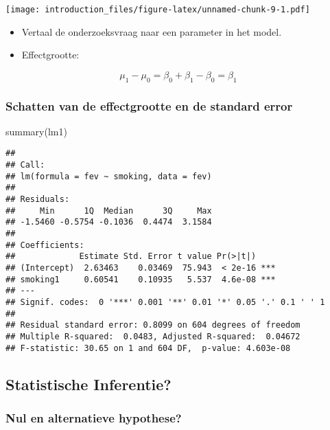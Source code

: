 \documentclass[
]{article}
\newenvironment{Shaded}{\begin{snugshade}}{\end{snugshade}}
\newcommand{\FunctionTok}[1]{\textcolor[rgb]{0.00,0.00,0.00}{#1}}
\newcommand{\NormalTok}[1]{#1}
\begin{document}
\texttt{[image: introduction\_files/figure-latex/unnamed-chunk-9-1.pdf]}

\begin{itemize}
\item
  Vertaal de onderzoeksvraag naar een parameter in het model.
\item
  Effectgrootte:
\end{itemize}

\[\mu_1-\mu_0 = \beta_0+\beta_1 - \beta_0 = \beta_1\]

\hypertarget{schatten-van-de-effectgrootte-en-de-standard-error}{%
\subsubsection{Schatten van de effectgrootte en de standard
error}\label{schatten-van-de-effectgrootte-en-de-standard-error}}

\begin{Shaded}
\begin{Highlighting}[]
\FunctionTok{summary}\NormalTok{(lm1)}
\end{Highlighting}
\end{Shaded}

\begin{verbatim}
## 
## Call:
## lm(formula = fev ~ smoking, data = fev)
## 
## Residuals:
##     Min      1Q  Median      3Q     Max 
## -1.5460 -0.5754 -0.1036  0.4474  3.1584 
## 
## Coefficients:
##             Estimate Std. Error t value Pr(>|t|)    
## (Intercept)  2.63463    0.03469  75.943  < 2e-16 ***
## smoking1     0.60541    0.10935   5.537  4.6e-08 ***
## ---
## Signif. codes:  0 '***' 0.001 '**' 0.01 '*' 0.05 '.' 0.1 ' ' 1
## 
## Residual standard error: 0.8099 on 604 degrees of freedom
## Multiple R-squared:  0.0483, Adjusted R-squared:  0.04672 
## F-statistic: 30.65 on 1 and 604 DF,  p-value: 4.603e-08
\end{verbatim}

\hypertarget{statistische-inferentie}{%
\subsection{Statistische Inferentie?}\label{statistische-inferentie}}

\hypertarget{nul-en-alternatieve-hypothese}{%
\subsubsection{Nul en alternatieve
hypothese?}\label{nul-en-alternatieve-hypothese}}
\end{document}
